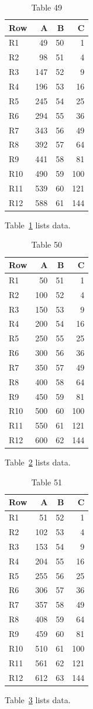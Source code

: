 \documentclass[10pt]{article}
\begin{document}
\begin{table}[ht]\centering\caption{Table 49}\label{tab:49}\begin{tabular}{lrrr}\toprule Row&A&B&C\\\midrule
R1&49&50&1\\
R2&98&51&4\\
R3&147&52&9\\
R4&196&53&16\\
R5&245&54&25\\
R6&294&55&36\\
R7&343&56&49\\
R8&392&57&64\\
R9&441&58&81\\
R10&490&59&100\\
R11&539&60&121\\
R12&588&61&144\\
\bottomrule\end{tabular}\end{table} Table~\ref{tab:49} lists data.
\begin{table}[ht]\centering\caption{Table 50}\label{tab:50}\begin{tabular}{lrrr}\toprule Row&A&B&C\\\midrule
R1&50&51&1\\
R2&100&52&4\\
R3&150&53&9\\
R4&200&54&16\\
R5&250&55&25\\
R6&300&56&36\\
R7&350&57&49\\
R8&400&58&64\\
R9&450&59&81\\
R10&500&60&100\\
R11&550&61&121\\
R12&600&62&144\\
\bottomrule\end{tabular}\end{table} Table~\ref{tab:50} lists data.
\begin{table}[ht]\centering\caption{Table 51}\label{tab:51}\begin{tabular}{lrrr}\toprule Row&A&B&C\\\midrule
R1&51&52&1\\
R2&102&53&4\\
R3&153&54&9\\
R4&204&55&16\\
R5&255&56&25\\
R6&306&57&36\\
R7&357&58&49\\
R8&408&59&64\\
R9&459&60&81\\
R10&510&61&100\\
R11&561&62&121\\
R12&612&63&144\\
\bottomrule\end{tabular}\end{table} Table~\ref{tab:51} lists data.
\end{document}
